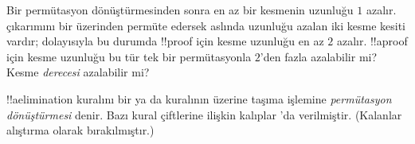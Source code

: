 \begin{prob}
Bir permütasyon dönüştürmesinden sonra en az bir kesmenin uzunluğu
$1$ azalır. \Elim{\land} çıkarımını bir \Elim{\lor} üzerinden permüte
edersek aslında uzunluğu azalan iki kesme kesiti vardır; dolayısıyla bu
durumda !!{proof} için kesme uzunluğu en az $2$ azalır. !!a{proof} için
kesme uzunluğu bu tür tek bir permütasyonla $2$'den fazla azalabilir
mi? Kesme \emph{derecesi} azalabilir mi?
\end{prob}

!!a{elimination} kuralını bir \Elim{\lor} ya da \Elim{\lexists}
kuralının üzerine taşıma işlemine \emph{permütasyon dönüştürmesi}
denir. Bazı kural çiftlerine ilişkin kalıplar
'da verilmiştir. (Kalanlar alıştırma
olarak bırakılmıştır.)

